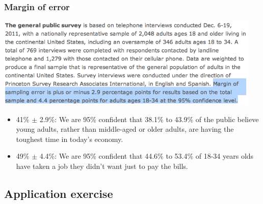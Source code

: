 \begin{frame}
\frametitle{Margin of error}

\begin{center}
\includegraphics[width=0.95\textwidth]{5-1_point_est_sampling_var/figures/pew/pew4}
\end{center}

\begin{itemize}

\item 41\% $\pm$ 2.9\%: We are 95\% confident that 38.1\% to 43.9\% of the public believe young adults, rather than middle-aged or older adults, are having the toughest time in today's economy.

\item 49\% $\pm$ 4.4\%: We are 95\% confident that 44.6\% to 53.4\% of 18-34 years olds have taken a job they didn't want just to pay the bills.

\end{itemize}

\end{frame}


\subsection{Application exercise}


\begin{frame}
\frametitle{}


\pause


\end{frame}


